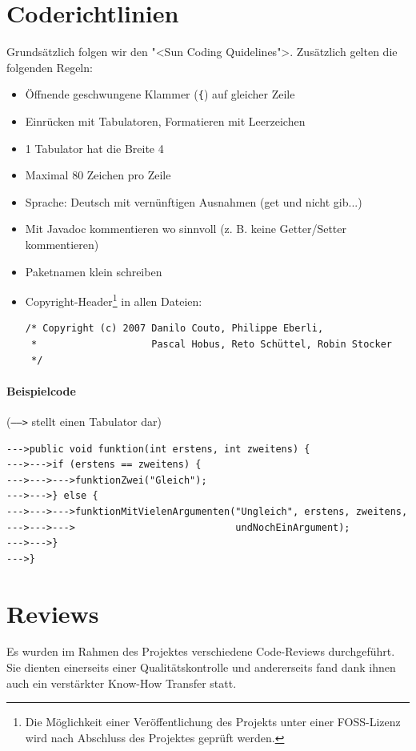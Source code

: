 \documentclass[12pt,halfparskip]{scrartcl}
\begin{document}


\section{Coderichtlinien}\label{sub:coderichtlinien} %

Grundsätzlich folgen wir den "<Sun Coding Quidelines">. Zusätzlich gelten die folgenden Regeln:

\begin{itemize}
  \item Öffnende geschwungene Klammer (\texttt{\{}) auf gleicher Zeile
  \item Einrücken mit Tabulatoren, Formatieren mit Leerzeichen
  \item 1 Tabulator hat die Breite 4
  \item Maximal 80 Zeichen pro Zeile
  \item Sprache: Deutsch mit vernünftigen Ausnahmen (get und nicht gib...)
  \item Mit Javadoc kommentieren wo sinnvoll (z. B. keine Getter/Setter kommentieren)
  \item Paketnamen klein schreiben
  \item Copyright-Header\footnote{Die Möglichkeit einer Veröffentlichung des Projekts unter einer FOSS-Lizenz wird nach Abschluss des Projektes geprüft werden.} in allen Dateien:
    \begin{verbatim}
/* Copyright (c) 2007 Danilo Couto, Philippe Eberli,
 *                    Pascal Hobus, Reto Schüttel, Robin Stocker
 */
    \end{verbatim}
\end{itemize}


\paragraph{Beispielcode} (\texttt{----->} stellt einen Tabulator dar)

\begin{verbatim}
--->public void funktion(int erstens, int zweitens) {
--->--->if (erstens == zweitens) {
--->--->--->funktionZwei("Gleich");
--->--->} else {
--->--->--->funktionMitVielenArgumenten("Ungleich", erstens, zweitens,
--->--->--->                            undNochEinArgument);
--->--->}
--->}
\end{verbatim}

\section{Reviews} %
\label{sec:reviews}
Es wurden im Rahmen des Projektes verschiedene Code-Reviews durchgeführt. Sie dienten einerseits einer Qualitätskontrolle und andererseits fand dank ihnen auch ein verstärkter Know-How Transfer statt.
\end{document}
